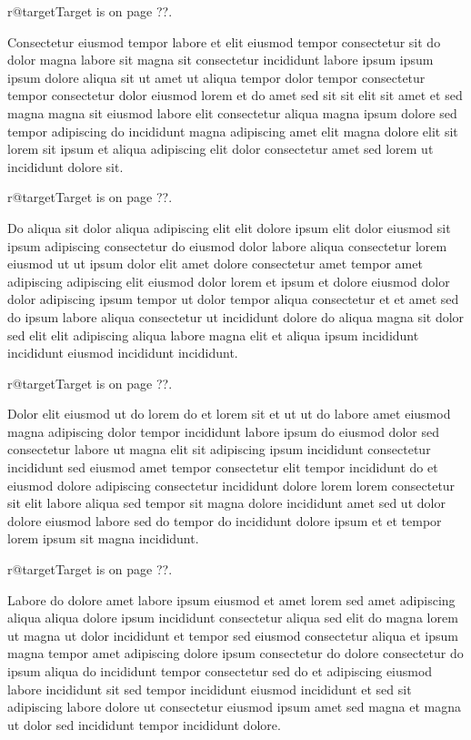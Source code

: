 \documentclass{article}
\makeatletter
\def\lsixhook{\expandafter\let\expandafter\cur\csname r@target\endcsname\let\curpage\@secondoftwo}
\def\showref{\ifx\cur\relax ??\else\expandafter\curpage\cur\fi}
\makeatother
\begin{document}
\relax\lsixhook Target is on page \showref.

Consectetur eiusmod tempor labore et elit eiusmod tempor consectetur sit do dolor magna labore sit magna sit consectetur incididunt labore ipsum ipsum ipsum dolore aliqua sit ut amet ut aliqua tempor dolor tempor consectetur tempor consectetur dolor eiusmod lorem et do amet sed sit sit elit sit amet et sed magna magna sit eiusmod labore elit consectetur aliqua magna ipsum dolore sed tempor adipiscing do incididunt magna adipiscing amet elit magna dolore elit sit lorem sit ipsum et aliqua adipiscing elit dolor consectetur amet sed lorem ut incididunt dolore sit.

\relax\lsixhook Target is on page \showref.

Do aliqua sit dolor aliqua adipiscing elit elit dolore ipsum elit dolor eiusmod sit ipsum adipiscing consectetur do eiusmod dolor labore aliqua consectetur lorem eiusmod ut ut ipsum dolor elit amet dolore consectetur amet tempor amet adipiscing adipiscing elit eiusmod dolor lorem et ipsum et dolore eiusmod dolor dolor adipiscing ipsum tempor ut dolor tempor aliqua consectetur et et amet sed do ipsum labore aliqua consectetur ut incididunt dolore do aliqua magna sit dolor sed elit elit adipiscing aliqua labore magna elit et aliqua ipsum incididunt incididunt eiusmod incididunt incididunt.

\relax\lsixhook Target is on page \showref.

Dolor elit eiusmod ut do lorem do et lorem sit et ut ut do labore amet eiusmod magna adipiscing dolor tempor incididunt labore ipsum do eiusmod dolor sed consectetur labore ut magna elit sit adipiscing ipsum incididunt consectetur incididunt sed eiusmod amet tempor consectetur elit tempor incididunt do et eiusmod dolore adipiscing consectetur incididunt dolore lorem lorem consectetur sit elit labore aliqua sed tempor sit magna dolore incididunt amet sed ut dolor dolore eiusmod labore sed do tempor do incididunt dolore ipsum et et tempor lorem ipsum sit magna incididunt.

\relax\lsixhook Target is on page \showref.

Labore do dolore amet labore ipsum eiusmod et amet lorem sed amet adipiscing aliqua aliqua dolore ipsum incididunt consectetur aliqua sed elit do magna lorem ut magna ut dolor incididunt et tempor sed eiusmod consectetur aliqua et ipsum magna tempor amet adipiscing dolore ipsum consectetur do dolore consectetur do ipsum aliqua do incididunt tempor consectetur sed do et adipiscing eiusmod labore incididunt sit sed tempor incididunt eiusmod incididunt et sed sit adipiscing labore dolore ut consectetur eiusmod ipsum amet sed magna et magna ut dolor sed incididunt tempor incididunt dolore.
\end{document}
